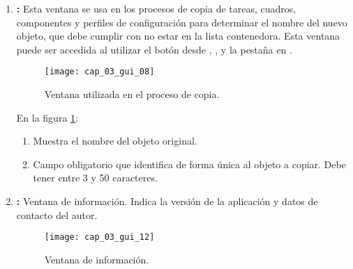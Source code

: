\documentclass[\main/Main.tex]{subfiles}
\begin{document}
\begin{enumerate}
				\item \textbf{:} Esta ventana se usa en los procesos de copia de tareas, cuadros, componentes y perfiles de configuración para determinar el nombre del nuevo objeto, que debe cumplir con no estar en la lista contenedora. Esta ventana puede ser accedida al utilizar el botón  desde , ,  y la pestaña  en . 
				\begin{figure}[H]
					\centering
					\texttt{[image: cap\_03\_gui\_08]}
					\caption{Ventana utilizada en el proceso de copia.}
					\label{fig:03_gui_copy}
				\end{figure}

				\vspace{-5mm}

				En la figura \ref{fig:03_gui_copy}:
				\begin{enumerate}[(1)]\setlength\itemsep{-0.5em}
					\item Muestra el nombre del objeto original.
					\item Campo obligatorio que identifica de forma única al objeto a copiar. Debe tener entre 3 y 50 caracteres.
				\end{enumerate}

				\item \textbf{:} Ventana de información. Indica la versión de la aplicación y datos de contacto del autor.
				\begin{figure}[H]
					\centering
					\texttt{[image: cap\_03\_gui\_12]}
					\caption{Ventana de información.}
					\label{fig:03_gui_about}
				\end{figure}

			\end{enumerate}		 

\end{document}
